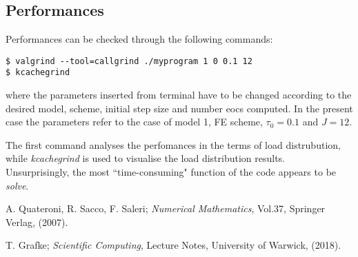 \documentclass[11pt]{article}
\theoremstyle{theorem}
\theoremstyle{definition}
\begin{document}
\subsection{Performances}
\label{subsec:perf}
Performances can be checked through the following commands:
\begin{verbatim}
$ valgrind --tool=callgrind ./myprogram 1 0 0.1 12
$ kcachegrind
\end{verbatim}

where the parameters inserted from terminal have to be changed according to the desired model, scheme, initial step size and number eocs computed. In the present case the parameters refer to the case of model 1, FE scheme, $\tau_0=0.1$ and $J=12$.  

The first command analyses the perfomances in the terms of load distrubution, while \emph{kcachegrind} is used to visualise the load distribution results.\\
Unsurprisingly, the most ``time-consuming" function of the code appears to be \emph{solve}.\\


\cleardoublepage
\begin{thebibliography}{99}

 A. Quateroni, R. Sacco, F. Saleri;
\emph{Numerical Mathematics}, Vol.37, Springer Verlag, (2007).

 T. Grafke;
\emph{Scientific Computing}, Lecture Notes, University of Warwick, (2018).







\printindex
\end{thebibliography}
\end{document}

